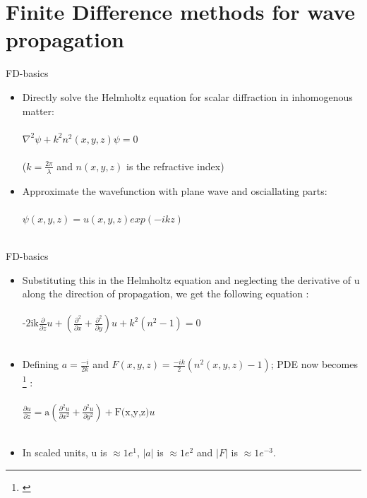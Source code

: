 \documentclass{beamer}
\begin{document}
\section{Finite Difference methods for wave propagation}

\begin{frame}{FD-basics}
	\begin{itemize}
		\item Directly solve the Helmholtz equation for scalar diffraction in inhomogenous matter: 
		\\~\\
		\qquad $\nabla^{2}\psi+k^{2}n^{2}(x,y,z)\psi=0$
		\\~\\
		($k=\frac{2\pi}{\lambda}$ and $n(x,y,z)$ is the refractive index)
		\item Approximate the wavefunction with plane wave and osciallating parts: 
		\\~\\ 
		\qquad $\psi(x,y,z) = u(x,y,z)exp(-ikz)$
		\\~\\
	\end{itemize}
\end{frame}

\begin{frame}{FD-basics}
	\begin{itemize}
		\item Substituting this in the Helmholtz equation and neglecting the derivative of u along the direction of propagation, we get the following equation :
		\\~\\
		\qquad	$\mbox{-2ik}\frac{\partial}{\partial z}u+(\frac{\partial ^{2}}{\partial x}+\frac{\partial ^{2}}{\partial y})u + k^{2}(n^{2}-1)=0$ 
		\\~\\
		\item Defining $a = \frac{-i}{2k}$ and $F(x,y,z) = \frac{-ik}{2}(n^{2}(x,y,z)-1)$; PDE now becomes \footnote{\cite{Fuhse_thesis,Kopylov}} :
		\\~\\
		\qquad $\frac{\partial u}{\partial z} = \mbox{a}(\frac{\partial ^{2}u}{\partial x^{2}}+\frac{\partial^{2}u}{\partial y^{2}}) + \mbox{F(x,y,z)}u$
		\\~\\
		\item In scaled units, u is $\approx1e^{1}$, $|a|$ is $\approx 1e^{2}$ and $|F|$ is $\approx 1e^{-3}$.
	\end{itemize}
\end{frame}
\end{document}
